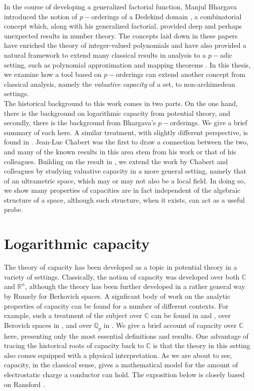
In the course of developing a generalized factorial function, Manjul Bhargava introduced the notion of $p-$orderings of a Dedekind domain \cite{mb1, mb2}, a combinatorial concept which, along with his generalized factorial, provided deep and perhaps unexpected results in number theory. The concepts laid down in these papers have enriched the theory of integer-valued polynomials \cite{mb3, kj2} and have also provided a natural framework to extend many classical results in analysis to a $p-$adic setting, such as polynomial approximation and mapping theorems \cite{mb1, mb2,mb3}. In this thesis, we examine how a tool based on $p-$orderings can extend another concept from classical analysis, namely the \textit{valuative capacity} of a set, to non-archimedean settings.\\

The historical background to this work comes in two parts. On the one hand, there is the background on logarithmic capacity from potential theory, and secondly, there is the background from Bhargava's $p-$orderings. We give a brief summary of each here. A similar treatment, with slightly different perspective, is found in \cite{fp}. Jean-Luc Chabert was the first to draw a connection between the two, and many of the known results in this area stem from his work or that of his colleagues. Building on the result in \cite{kj}, we extend the work by Chabert and colleagues by studying valuative capacity in a more general setting, namely that of an ultrametric space, which may or may not also be a local field. In doing so, we show many properties of capacities are in fact independent of the algebraic structure of a space, although such structure, when it exists, can act as a useful probe.\\

\section{Logarithmic capacity}
The theory of capacity has been developed as a topic in potential theory in a variety of settings. Classically, the notion of capacity was developed over both $\mathbb{C}$ and $\mathbb{R}^n$, although the theory has been further developed in a rather general way by Rumely for Berkovich spaces. A  signficant body of work on the analytic properties of capacity can be found for a number of different contexts. For example, such a treatment of the subject over $\mathbb{C}$ can be found in \cite{wer} and \cite{rand}, over Berovich spaces in \cite{rum}, and over $\mathbb{Q}_p$ in \cite{dgc}. We give a brief account of capacity over $\mathbb{C}$ here, presenting only the most essential definitions and results.   One advantage of tracing the historical roots of capacity back to $\mathbb{C}$ is that the theory in this setting also comes equipped with a physical interpretation. As we are about to see, capacity, in the classical sense, gives a mathematical model for the amount of electrostatic charge a conductor can hold. The exposition below is closely based on Ransford \cite{rand}.\\

